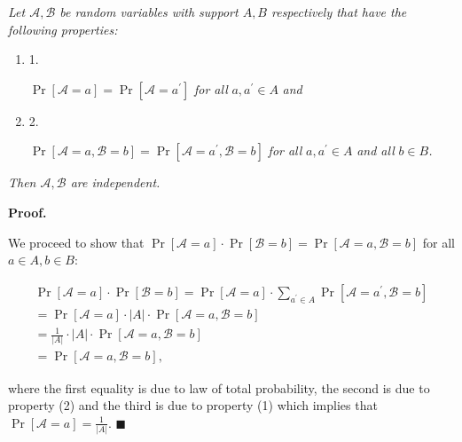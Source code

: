 \emph{Let $\mathcal{A},\mathcal{B}$ be random variables with support $A,B$ respectively that have the following properties:}\par


\begin{enumerate}


\item[] 1. 


$\Pr[\mathcal{A}=a]=\Pr[\mathcal{A}=a^{\prime}]$\emph{ for all }$a,a^{\prime}\in A$\emph{ and}\par




\item[] 2. 


$\Pr[\mathcal{A}=a,\mathcal{B}=b]=\Pr[\mathcal{A}=a^{\prime},\mathcal{B}=b]$\emph{ for all }$a,a^{\prime}\in A$\emph{ and all }$b\in B$\emph{.}\par




\end{enumerate}


\emph{Then $\mathcal{A},\mathcal{B}$ are independent.}\par






\par\medskip\noindent\textbf{Proof.}\par



We proceed to show that $\Pr[\mathcal{A}=a]\cdot\Pr[\mathcal{B}=b]=\Pr[\mathcal{A}=a,\mathcal{B}=b]$ for all $a\in A,b\in B$:\par


\[\begin{gathered}
\displaystyle\Pr[\mathcal{A}=a]\cdot\Pr[\mathcal{B}=b] \displaystyle=\Pr[\mathcal{A}=a]\cdot\sum_{a^{\prime}\in A}\Pr[\mathcal{A}=a^{\prime},\mathcal{B}=b] \\
\displaystyle=\Pr[\mathcal{A}=a]\cdot|A|\cdot\Pr[\mathcal{A}=a,\mathcal{B}=b] \\
\displaystyle=\frac{1}{|A|}\cdot|A|\cdot\Pr[\mathcal{A}=a,\mathcal{B}=b] \\
\displaystyle=\Pr[\mathcal{A}=a,\mathcal{B}=b],
\end{gathered}\]


where the first equality is due to law of total probability, the second is due to property (2) and the third is due to property (1) which implies that $\Pr[\mathcal{A}=a]=\frac{1}{|A|}$.
\ensuremath{\blacksquare}\par







